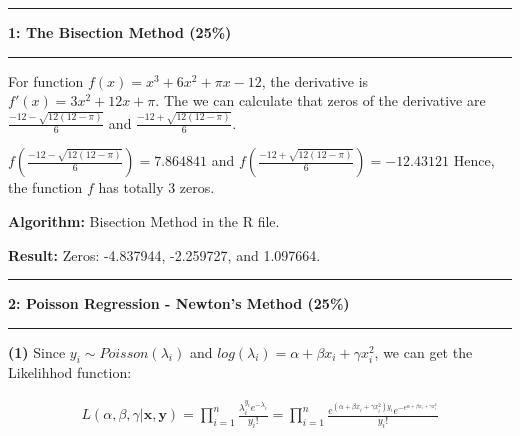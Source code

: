 \documentclass[11pt]{article}
\newcommand\question[2]{\vspace{.25in}\hrule\textbf{#1: #2}\vspace{.5em}\hrule\vspace{.10in}}
\renewcommand\part[1]{\vspace{.10in}\textbf{(#1)}}
\newcommand\algorithm{\vspace{.10in}\textbf{Algorithm: }}
\newcommand\result{\vspace{.10in}\textbf{Result: }}
\begin{document}
\raggedright
\newcommand\NAME{ZHANG Xinfang}  %
\newcommand\ANDREWID{1155141566}     %
\newcommand\HWNUM{1}              %

\question{1}{The Bisection Method (25\%)} 
For function $f(x) = x^3 + 6x^2 + \pi x - 12$, the derivative is $f'(x) = 3x^2 + 12x + \pi$. The we can calculate that 
zeros of the derivative are $\frac{-12 - \sqrt{12(12-\pi)}}{6}$ and $\frac{-12 + \sqrt{12(12-\pi)}}{6}$.

$f(\frac{-12 - \sqrt{12(12-\pi)}}{6}) = 7.864841$ and $f(\frac{-12 + \sqrt{12(12-\pi)}}{6}) = -12.43121$
Hence, the function $f$ has totally 3 zeros.

\algorithm{Bisection Method in the R file.}

\result{Zeros: -4.837944, -2.259727, and 1.097664.}

\question{2}{Poisson Regression - Newton's Method (25\%)}

\part{1} Since $y_i \sim Poisson(\lambda_i)$ and $log(\lambda_i) = \alpha + \beta x_i + \gamma x_i^2$, we can get the Likelihhod function:

\begin{align*}
    L(\alpha, \beta, \gamma|\mathbf{x}, \mathbf{y}) = \prod_{i=1}^{n} \frac{\lambda_i^{y_i} e^{-\lambda_i}}{y_i !} = \prod_{i=1}^{n} \frac{e^{(\alpha + \beta x_i + \gamma x_i^2)y_i} e^{-e^{\alpha + \beta x_i + \gamma x_i^2}}}{y_i !}
\end{align*}
\end{document}
